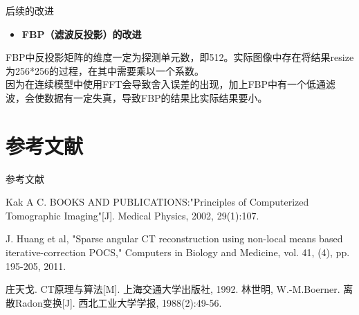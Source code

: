 \documentclass[serif]{beamer} %
\begin{document}
	\begin{frame}{后续的改进}
		\begin{itemize}
			\item \textbf{FBP（滤波反投影）的改进}
		\end{itemize}


		\small FBP中反投影矩阵的维度一定为探测单元数，即512。实际图像中存在将结果resize为256*256的过程，在其中需要乘以一个系数。\\
		

		因为在连续模型中使用FFT会导致舍入误差的出现，加上FBP中有一个低通滤波，会使数据有一定失真，导致FBP的结果比实际结果要小。
	\end{frame}

\section{参考文献}
\begin{frame}{参考文献}
	\begin{thebibliography}{0}
		    
		Kak A C. BOOKS AND PUBLICATIONS:"Principles of Computerized Tomographic Imaging"[J]. Medical Physics, 2002, 29(1):107.
		    
		J. Huang et al, "Sparse angular CT reconstruction using non-local means based iterative-correction POCS," Computers in Biology and Medicine, vol. 41, (4), pp. 195-205, 2011.
		    
		庄天戈. CT原理与算法[M]. 上海交通大学出版社, 1992.
		林世明, W.-M.Boerner. 离散Radon变换[J]. 西北工业大学学报, 1988(2):49-56.
	\end{thebibliography}
\end{frame} %


\end{document}
